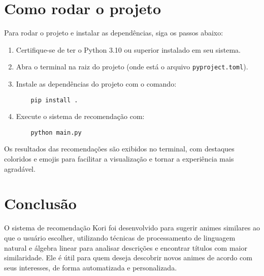 \documentclass{article}
\begin{document}
\section{Como rodar o projeto}
Para rodar o projeto e instalar as dependências, siga os passos abaixo:

\begin{enumerate}
    \item Certifique-se de ter o Python 3.10 ou superior instalado em seu sistema.
    \item Abra o terminal na raiz do projeto (onde está o arquivo \texttt{pyproject.toml}).
    \item Instale as dependências do projeto com o comando:
    \begin{verbatim}
    pip install .
    \end{verbatim}
    \item Execute o sistema de recomendação com:
    \begin{verbatim}
    python main.py
    \end{verbatim}
\end{enumerate}

Os resultados das recomendações são exibidos no terminal, com destaques coloridos e emojis para facilitar a visualização e tornar a experiência mais agradável.

\section{Conclusão}
O sistema de recomendação Kori foi desenvolvido para sugerir animes similares ao que o usuário escolher, utilizando técnicas de processamento de linguagem natural e álgebra linear para analisar descrições e encontrar títulos com maior similaridade. Ele é útil para quem deseja descobrir novos animes de acordo com seus interesses, de forma automatizada e personalizada.
\end{document}

